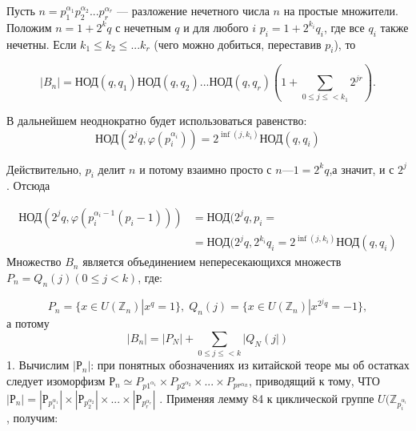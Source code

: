 \documentclass{mai_book}
\begin{document}
	\begin{lemma}
	\noindent
	
	Пусть $n = p_{1}^{\alpha_{1}}p_{2}^{\alpha_{2}} ...p_{r}^{\alpha_{r}}$ 	— разложение нечетного числа $n$ на про­стые множители. Положим $n = 1 + 2^kq$ с нечетным $q$ и для любого $i$ $p_i = 1 + 2^{k_{i}}q_i$, где все $q_i$ также нечетны. Если $k_1 \leqslant	k_2 \leqslant ...	k_r$	(чего
	можно добиться, переставив $p_i$), то

	\end{lemma}	

	\begin{equation}
		|B_n| = \text{НОД}(q,q_1)\text{НОД}(q,q_2)...\text{НОД}(q,q_r)(1+\sum_{0\leqslant j \leqslant < k_1} 2^{jr}).
	\end{equation}
	
	\begin{myproof}
	В дальнейшем неоднократно будет использоваться равенство: 
	\begin{equation}
	\text{НОД}(2^jq,\varphi(p_{i}^{\alpha_i}))=2^{\inf(j,k_i)}\text{НОД}(q,q_i)
	\end{equation}
	
	
	
	\noindent
	Действительно, $p_i$ делит $n$ и потому взаимно просто с $n — 1 = 2^kq$,а значит, и с $2^j$	. Отсюда
	
	\begin{equation}
	\begin{split}
	\text{НОД}(2^jq,\varphi(p_{i}^{\alpha_i-1}(p_i-1))) & = \text{НОД}(2^jq,p_{i} = \\ & = \text{НОД}(2^jq,2^{k_{i}}q_i = 2^{\inf(j,k_i)}\text{НОД}(q,q_i)
	\end{split}
	\end{equation}
	Множество $B_n$	является объединением непересекающихся множеств $P_n = Q_n(j)(0 \leqslant j<k)$, где:
	
	\begin{equation}
	P_n = \{x \in U(\mathbb Z_n) | x^q= 1 \}, \; Q_n(j) = \{x \in U(\mathbb Z_n) | x^{2^{j}q}= -1 \},
	\end{equation}
	а потому
	\begin{equation}
	|B_n| = |P_N|+\sum_{0\leqslant j \leqslant < k} |Q_N(j|)
	\end{equation}
	1. Вычислим $|Р_n|$: при понятных обозначениях из китайской теоре	мы об остатках следует изоморфизм $Р_n \simeq P_{p{1}^{\alpha_1}} \times P_{p{2}^{\alpha_2}} \times ... \times P_{p{r}^{\alpha_R}}$,
	приводящий к тому, ЧТО $|Р_n| = |Р_{p^{\alpha_{1}}_1}| \times |Р_{p^{\alpha_{2}}_2}| \times ... \times |Р_{p^{\alpha_{r}}_r}|$ . Применяя
	лемму 84 к  циклической группе $U(\mathbb Z_{p_{i}^{\alpha_i}}$, получим:


\end{myproof}
\end{document}
